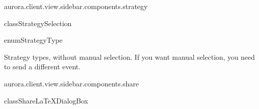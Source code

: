 \begin{texdocpackage}{aurora.client.view.sidebar.components.strategy}
\label{texdoclet:aurora.client.view.sidebar.components.strategy}

\begin{texdocclass}{class}{StrategySelection}
\label{texdoclet:aurora.client.view.sidebar.components.strategy.StrategySelection}
\begin{texdocclassintro}
\end{texdocclassintro}
\begin{texdocclassconstructors}
\end{texdocclassconstructors}
\begin{texdocclassmethods}
\end{texdocclassmethods}
\end{texdocclass}


\begin{texdocclass}{enum}{StrategyType}
\label{texdoclet:aurora.client.view.sidebar.components.strategy.StrategyType}
\begin{texdocclassintro}
Strategy types, without manual selection.
 If you want manual selection, you need to send a different event.\end{texdocclassintro}
\begin{texdocenums}
\end{texdocenums}
\begin{texdocclassmethods}
\end{texdocclassmethods}
\end{texdocclass}


\end{texdocpackage}



\begin{texdocpackage}{aurora.client.view.sidebar.components.share}
\label{texdoclet:aurora.client.view.sidebar.components.share}

\begin{texdocclass}{class}{ShareLaTeXDialogBox}
\label{texdoclet:aurora.client.view.sidebar.components.share.ShareLaTeXDialogBox}
\begin{texdocclassintro}
\end{texdocclassintro}
\begin{texdocclassconstructors}
\end{texdocclassconstructors}
\end{texdocclass}


\end{texdocpackage}



